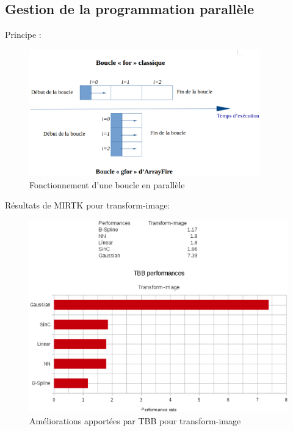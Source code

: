 \documentclass[10pt]{report}
\begin{document}
	\subsection{Gestion de la programmation parallèle}
Principe :
	\begin{figure}[h!]
		\begin{center}
			\includegraphics[width=10cm]{Reports/figures/gfor.eps}
		\end{center}	
		\caption{Fonctionnement d'une boucle en parallèle}
		\label{Fonctionnement d'une boucle en parallèle}
	\end{figure}
	
Résultats de MIRTK pour transform-image:
	\begin{figure}[h!]
		\begin{center}
			\includegraphics[width=12cm]{Reports/figures/performances_tbb_transform_image.eps}
		\end{center}	
		\caption{Améliorations apportées par TBB pour transform-image}
		\label{Améliorations apportées par TBB pour transform-image}
	\end{figure}
	
\end{document}
